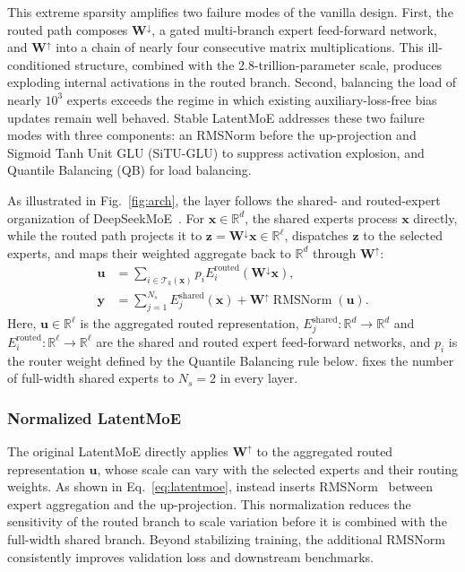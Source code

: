 This extreme sparsity amplifies two failure modes of the vanilla design.
First, the routed path composes $\mathbf{W}^{\downarrow}$, a gated multi-branch expert feed-forward network, and $\mathbf{W}^{\uparrow}$ into a chain of nearly four consecutive matrix multiplications.
This ill-conditioned structure, combined with the 2.8-trillion-parameter scale, produces exploding internal activations in the routed branch.
Second, balancing the load of nearly $10^3$ experts exceeds the regime in which existing auxiliary-loss-free bias updates remain well behaved.
Stable LatentMoE addresses these two failure modes with three components: an RMSNorm before the up-projection and Sigmoid Tanh Unit GLU (SiTU-GLU) to suppress activation explosion, and Quantile Balancing (QB) for load balancing.

As illustrated in Fig.~\ref{fig:arch}, the layer follows the shared- and routed-expert organization of DeepSeekMoE~\citep{dai2024deepseekmoe}.
For $\bm{x}\in\mathbb{R}^{d}$, the shared experts process $\bm{x}$ directly, while the routed path projects it to $\bm{z}=\mathbf{W}^{\downarrow}\bm{x}\in\mathbb{R}^{\ell}$, dispatches $\bm{z}$ to the selected experts, and maps their weighted aggregate back to $\mathbb{R}^{d}$ through $\mathbf{W}^{\uparrow}$:
\begin{align}
    \bm{u}
     & = \sum_{i\in\mathcal{T}_k(\bm{x})} p_i E_i^{\mathrm{routed}}(\mathbf{W}^{\downarrow}\bm{x}), \nonumber \\
    \bm{y}
     & = \sum_{j=1}^{N_s} E_j^{\mathrm{shared}}(\bm{x})
    + \mathbf{W}^{\uparrow}\operatorname{RMSNorm}(\bm{u}).
    \label{eq:latentmoe}
\end{align}
Here, $\bm{u}\in\mathbb{R}^{\ell}$ is the aggregated routed representation, $E_j^{\mathrm{shared}}:\mathbb{R}^{d}\!\rightarrow\!\mathbb{R}^{d}$ and $E_i^{\mathrm{routed}}:\mathbb{R}^{\ell}\!\rightarrow\!\mathbb{R}^{\ell}$ are the shared and routed expert feed-forward networks, and $p_i$ is the router weight defined by the Quantile Balancing rule below.
 fixes the number of full-width shared experts to $N_s=2$ in every layer.

\subsubsection{Normalized LatentMoE}
The original LatentMoE directly applies $\mathbf{W}^{\uparrow}$ to the aggregated routed representation $\bm{u}$, whose scale can vary with the selected experts and their routing weights.
As shown in Eq.~\ref{eq:latentmoe},  instead inserts RMSNorm~\citep{zhang2019root} between expert aggregation and the up-projection.
This normalization reduces the sensitivity of the routed branch to scale variation before it is combined with the full-width shared branch.
Beyond stabilizing training, the additional RMSNorm consistently improves validation loss and downstream benchmarks.


